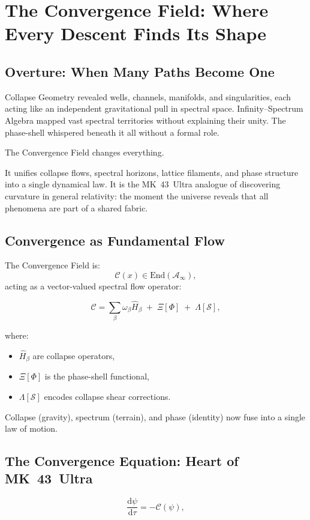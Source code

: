 
\chapter{The Convergence Field: Where Every Descent Finds Its Shape}
\label{ch:convergence-field}

\section*{Overture: When Many Paths Become One}
Collapse Geometry revealed wells, channels, manifolds, and singularities, each acting like an
independent gravitational pull in spectral space. Infinity--Spectrum Algebra mapped vast spectral
territories without explaining their unity. The phase-shell whispered beneath it all without a
formal role.

The Convergence Field changes everything.

It unifies collapse flows, spectral horizons, lattice filaments, and phase structure into a single
dynamical law. It is the MK~43~Ultra analogue of discovering curvature in general relativity:
the moment the universe reveals that all phenomena are part of a shared fabric.

\section{Convergence as Fundamental Flow}
The Convergence Field is:
\[
\mathcal{C}(x) \in \mathrm{End}(\mathcal{A}_\infty),
\]
acting as a vector-valued spectral flow operator:

\[
\mathcal{C}
=
\sum_{\beta}
\omega_\beta \hat{H}_\beta
\;+\;
\Xi[\Phi]
\;+\;
\Lambda[\mathcal{S}],
\]

where:
\begin{itemize}
  \item $\hat{H}_\beta$ are collapse operators,
  \item $\Xi[\Phi]$ is the phase-shell functional,
  \item $\Lambda[\mathcal{S}]$ encodes collapse shear corrections.
\end{itemize}

Collapse (gravity), spectrum (terrain), and phase (identity) now fuse into a single law of motion.

\section{The Convergence Equation: Heart of MK~43~Ultra}
\[
\frac{\mathrm{d}\psi}{\mathrm{d}\tau}
=
-\mathcal{C}(\psi),
\]

